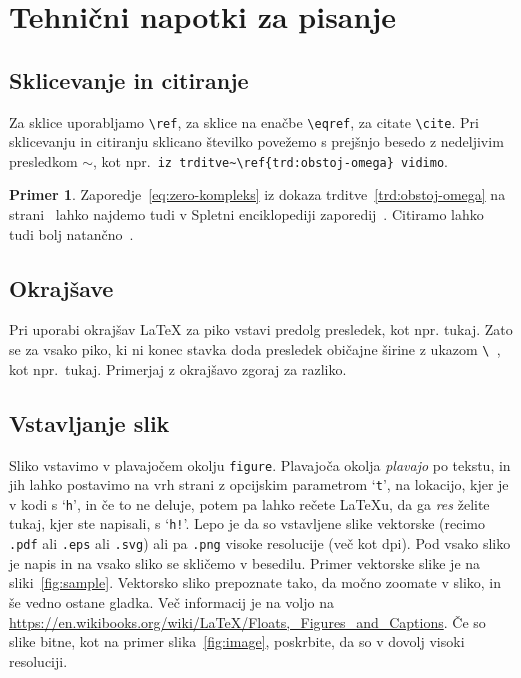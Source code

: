 \documentclass[12pt,a4paper,twoside]{article}
\theoremstyle{definition} %
\newtheorem{primer}[definicija]{Primer}
\theoremstyle{plain} %
\numberwithin{equation}{section}  %
\begin{document}
\section{Tehnični napotki za pisanje}

\subsection{Sklicevanje in citiranje}
Za sklice uporabljamo \verb|\ref|, za sklice na enačbe \verb|\eqref|, za citate \verb|\cite|. Pri
sklicevanju in citiranju sklicano številko povežemo s prejšnjo besedo z nedeljivim presledkom
$\sim$, kot npr.\ \verb|iz trditve~\ref{trd:obstoj-omega} vidimo|.

\begin{primer}
  Zaporedje~\eqref{eq:zero-kompleks} iz dokaza trditve~\ref{trd:obstoj-omega} na
  strani~\pageref{trd:obstoj-omega} lahko najdemo tudi v Spletni enciklopediji zaporedij~\cite{oeis}.
  Citiramo lahko tudi bolj natančno~\cite[trditev 2.1, str.\ 23]{lebedev2009introduction}.
\end{primer}

\subsection{Okrajšave}
Pri uporabi okrajšav \LaTeX{} za piko vstavi predolg presledek, kot npr. tukaj. Zato se za vsako
piko, ki ni konec stavka doda presledek običajne širine z ukazom \verb*|\ |, kot npr.\ tukaj.
Primerjaj z okrajšavo zgoraj za razliko.

\subsection{Vstavljanje slik}
Sliko vstavimo v plavajočem okolju \texttt{figure}. Plavajoča okolja \emph{plavajo} po tekstu, in
jih lahko postavimo na vrh strani z opcijskim parametrom `\texttt{t}', na lokacijo, kjer je v kodi s
`\texttt{h}', in če to ne deluje, potem pa lahko rečete \LaTeX u, da ga \emph{res} želite tukaj,
kjer ste napisali, s `\texttt{h!}'. Lepo je da so vstavljene slike vektorske (recimo \texttt{.pdf}
ali \texttt{.eps} ali \texttt{.svg}) ali pa \texttt{.png} visoke resolucije (več kot
\unit[300]{dpi}).  Pod vsako sliko je napis in na vsako sliko se skličemo v besedilu. Primer
vektorske slike je na sliki~\ref{fig:sample}. Vektorsko sliko prepoznate tako, da močno
zoomate v sliko, in še vedno ostane gladka. Več informacij je na voljo na
\url{https://en.wikibooks.org/wiki/LaTeX/Floats,_Figures_and_Captions}. Če so slike bitne, kot na
primer slika~\ref{fig:image}, poskrbite, da so v dovolj visoki resoluciji.
\end{document}
